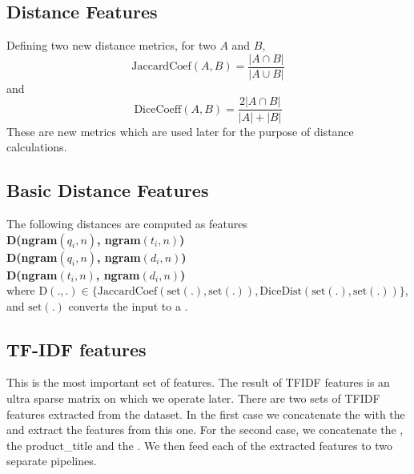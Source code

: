 \documentclass[BTech]{nitkdiss}
\begin{document}
\subsection{Distance Features}
Defining two new distance metrics, for two  $A$ and $B$,
$$\textrm{JaccardCoef}(A, B) = \frac{|A\cap B|}{|A \cup B|}$$
and
$$\textrm{DiceCoeff}(A,B) = \frac{2|A \cap B|}{|A| + |B|}$$
These are new metrics which are used later for the purpose of distance calculations. 
\subsection{Basic Distance Features}
The following distances are computed as features\\
\textbf{D(ngram$(q_i, n)$, ngram$(t_i, n)$)}\\
\textbf{D(ngram$(q_i, n)$, ngram$(d_i, n)$)}\\
\textbf{D(ngram$(t_i, n)$, ngram$(d_i, n)$)}\\
where D$(. , .)\in\{\textrm{JaccardCoef}(\textrm{set}(.), \textrm{set}(.)), \textrm{DiceDist}(\textrm{set}(.), \textrm{set}(.))\}$, and $\textrm{set}(.)$ converts
the input  to a .

\subsection{TF-IDF features}
This is the most important set of features. The result of TFIDF features is an ultra sparse matrix on which we operate later. There are two sets of TFIDF features extracted from the dataset. In the first case we concatenate the  with the  and extract the features from this one. For the second case, we concatenate the , the {product\_title} and the . We then feed each of the extracted features to two separate pipelines.
\end{document}
